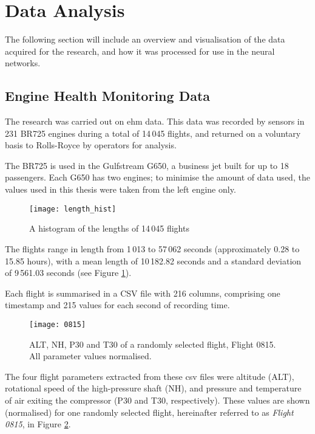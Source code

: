 \section{Data Analysis}
The following section will include an overview and visualisation of the data acquired for the research, and how it was processed for use in the neural networks.

\subsection{Engine Health Monitoring Data} \label{sec:ehm}
The research was carried out on \ac{ehm} data. This data was recorded by sensors in 231 BR725 engines during a total of 14\,045 flights, and returned on a voluntary basis to Rolls-Royce by operators for analysis.

The BR725 is used in the Gulfstream G650, a business jet built for up to 18 passengers. Each G650 has two engines; to minimise the amount of data used, the values used in this thesis were taken from the left engine only.

\begin{figure}
    \centering
    \texttt{[image: length\_hist]}
    \caption{\label{fig:flight_len} A histogram of the lengths of 14\,045 flights}
\end{figure}

The flights range in length from 1\,013 to 57\,062 seconds (approximately 0.28 to 15.85 hours), with a mean length of 10\,182.82 seconds and a standard deviation of 9\,561.03 seconds (see Figure \ref{fig:flight_len}).

Each flight is summarised in a CSV file with 216 columns, comprising one timestamp and 215 values for each second of recording time.

\begin{figure}
    \centering
    \texttt{[image: 0815]}
    \caption{\label{fig:flight_example} ALT, NH, P30 and T30 of a randomly selected flight, Flight 0815. All parameter values normalised.}
\end{figure}

The four flight parameters extracted from these \ac{csv} files were altitude (ALT), rotational speed of the high-pressure shaft (NH), and pressure and temperature of air exiting the compressor (P30 and T30, respectively). These values are shown (normalised) for one randomly selected flight, hereinafter referred to as \textit{Flight 0815}, in Figure \ref{fig:flight_example}.

